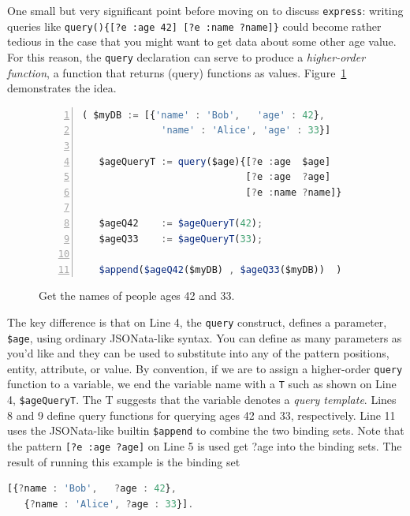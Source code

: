 \documentclass[10pt,letterpaper]{article} %
\newcommand{\stt}[1]{\texttt{#1}} %
\begin{document}
One small but very significant point before moving on to discuss \stt{express}:
writing queries like \stt{query()\{[?e :age 42] [?e :name ?name]\}} could become rather tedious in the case that you might want to get data about some other age value.
For this reason, the \stt{query} declaration can serve to produce a \textit{higher-order function}, a function that returns (query) functions as values. Figure~\ref{code:higher-order-query} demonstrates the idea.


\begin{figure}[H]
    \caption{Get the names of people ages 42 and 33.}
    \label{code:higher-order-query}
\begin{lstlisting}[language=JavaScript,numberstyle=\scriptsize,basicstyle=\ttfamily\scriptsize,numbers=left,stepnumber=1,breaklines=true]
 ( $myDB := [{'name' : 'Bob',   'age' : 42},
              'name' : 'Alice', 'age' : 33}]

   $ageQueryT := query($age){[?e :age  $age]
                             [?e :age  ?age]
                             [?e :name ?name]}

   $ageQ42    := $ageQueryT(42);
   $ageQ33    := $ageQueryT(33);

   $append($ageQ42($myDB) , $ageQ33($myDB))  )
\end{lstlisting}
\end{figure} \vspace{-2em}

The key difference is that on Line 4, the \stt{query} construct, defines a parameter, \stt{\$age}, using ordinary JSONata-like syntax.
You can define as many parameters as you'd like and they can be used to substitute into any of the pattern positions, entity, attribute, or value.
By convention, if we are to assign a higher-order \stt{query} function to a variable, we end the variable name with a \stt{T} such as shown on Line 4, \stt{\$ageQueryT}.
The T suggests that the variable denotes a \textit{query template}.
Lines 8 and 9 define query functions for querying ages 42 and 33, respectively.
Line 11 uses the JSONata-like builtin \stt{\$append} to combine the two binding sets.
Note that the pattern \stt{[?e :age ?age]} on Line 5 is used get ?age into the binding sets.
The result of running this example is the binding set

\begin{lstlisting}[language=JavaScript,numbers=none,basicstyle=\ttfamily\scriptsize]
  [{?name : 'Bob',   ?age : 42},
   {?name : 'Alice', ?age : 33}].
\end{lstlisting} \vspace{-2em}
\end{document}
